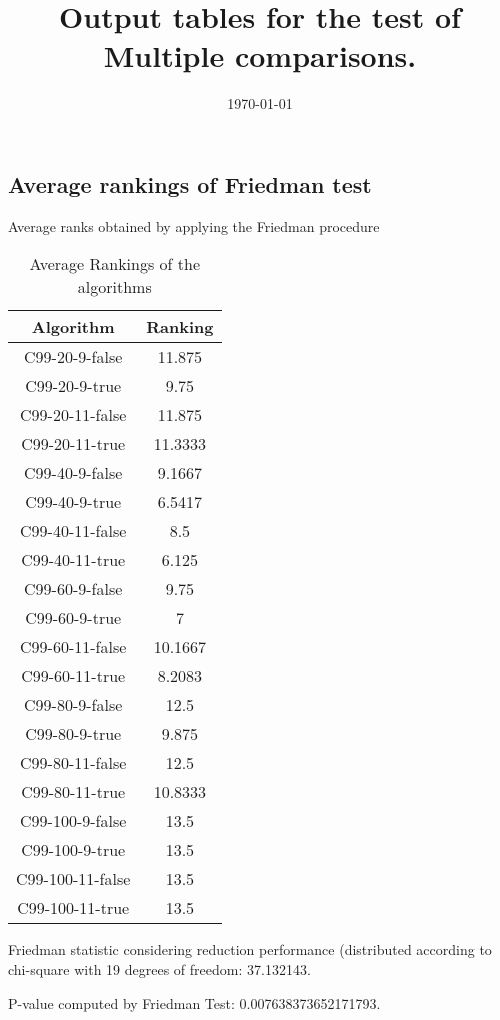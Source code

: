 \documentclass[a4paper,10pt]{article}
\title{Output tables for the test of Multiple comparisons.}
\author{}
\date{\today}
\begin{document}
\begin{landscape}
\pagestyle{empty}
\maketitle
\thispagestyle{empty}
\section{Average rankings of Friedman test}



Average ranks obtained by applying the Friedman procedure

\begin{table}[!htp]
\centering
\begin{tabular}{|c|c|}\hline
Algorithm&Ranking\\\hline
C99-20-9-false & 11.875\\
C99-20-9-true & 9.75\\
C99-20-11-false & 11.875\\
C99-20-11-true & 11.3333\\
C99-40-9-false & 9.1667\\
C99-40-9-true & 6.5417\\
C99-40-11-false & 8.5\\
C99-40-11-true & 6.125\\
C99-60-9-false & 9.75\\
C99-60-9-true & 7\\
C99-60-11-false & 10.1667\\
C99-60-11-true & 8.2083\\
C99-80-9-false & 12.5\\
C99-80-9-true & 9.875\\
C99-80-11-false & 12.5\\
C99-80-11-true & 10.8333\\
C99-100-9-false & 13.5\\
C99-100-9-true & 13.5\\
C99-100-11-false & 13.5\\
C99-100-11-true & 13.5\\
\hline
\end{tabular}
\caption{Average Rankings of the algorithms}
\end{table}

Friedman statistic considering reduction performance (distributed according to chi-square with 19 degrees of freedom: 37.132143.

P-value computed by Friedman Test: 0.007638373652171793.\newline




\end{landscape}
\end{document}
